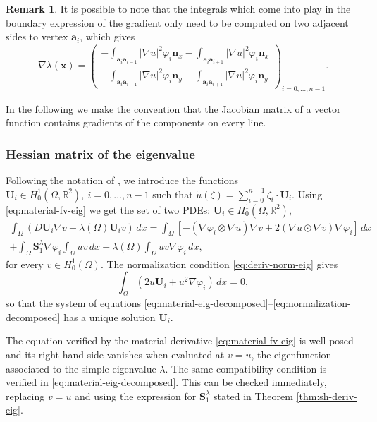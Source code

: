 \documentclass[JEP,XML,SOM,Unicode,ThmDefs,NoFloatCountersInSection,published]{cedram}
\theoremstyle{plain}
\theoremstyle{definition}
\newtheorem{rem}[thm]{Remark}
\newcommand{\bo}[1]{{\boldsymbol#1}}
\let\Bbb\mathbb
\begin{document}
\begin{rem}
It is possible to note that the integrals which come into play in the boundary expression of the gradient only need to be computed on two adjacent sides to vertex $\bo a_i$, which gives
\[
\nabla \lambda (\bo x) = \begin{pmatrix}
-\int_{\bo a_{i}\bo a_{i-1}}|\nabla u|^2\varphi_i \bo n_x-\int_{\bo a_{i}\bo a_{i+1}}|\nabla u|^2\varphi_i \bo n_x\\
-\int_{\bo a_{i}\bo a_{i-1}}|\nabla u|^2\varphi_i \bo n_y-\int_{\bo a_{i}\bo a_{i+1}}|\nabla u|^2\varphi_i \bo n_y
\end{pmatrix}_{i=0,\dots,n-1}.
\]
\label{rem:grad-explicit}
\end{rem}

In the following we make the convention that the Jacobian matrix of a vector function contains gradients of the components on every line.

\subsubsection*{Hessian matrix of the eigenvalue} Following the notation of \cite{laurain2ndDeriv}, we introduce the functions $\bo U_i \in H_0^1(\Omega,\Bbb{R}^2),\ i=0,\dots,n-1$ such that $\dot u(\zeta) = \sum_{i=0}^{n-1} \zeta_i \cdot \bo U_i$. Using \eqref{eq:material-fv-eig} we get the set of two PDEs: $\bo U_i \in H_0^1(\Omega,\Bbb{R}^2)$,
\vspace*{-5pt}
\begin{multline}\label{eq:material-eig-decomposed}
\int_\Omega (D \bo U_i \nabla v-\lambda(\Omega) \bo U_iv) \, dx = \int_\Omega \left[-(\nabla \varphi_i\otimes \nabla u)\nabla v+2(\nabla u \odot \nabla v)\nabla \varphi_i\right] \, dx\\
+\int_\Omega \bo S_1^\lambda \nabla \varphi_i \int_\Omega uv\, dx + \lambda(\Omega) \int_\Omega uv \nabla \varphi_i\, dx,
\end{multline}
for every $v\in H_0^1(\Omega)$. The normalization condition \eqref{eq:deriv-norm-eig} gives
\begin{equation}
\int_\Omega (2u \bo U_i + u^2 \nabla \varphi_i)\, dx = 0,
\label{eq:normalization-decomposed}
\end{equation}
so that the system of equations \eqref{eq:material-eig-decomposed}--\eqref{eq:normalization-decomposed} has a unique solution $\bo U_i$.

The equation verified by the material derivative \eqref{eq:material-fv-eig} is well posed and its right hand side vanishes when evaluated at $v=u$, the eigenfunction associated to the simple eigenvalue $\lambda$. The same compatibility condition is verified in \eqref{eq:material-eig-decomposed}. This can be checked immediately, replacing $v=u$ and using the expression for $\bo S_1^\lambda$ stated in Theorem \ref{thm:sh-deriv-eig}.
\end{document}

